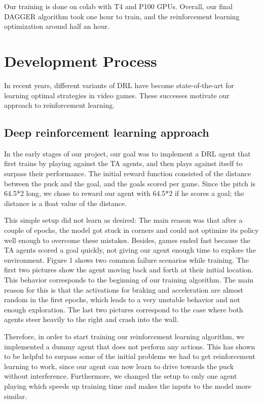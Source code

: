 \documentclass[10pt,twocolumn,letterpaper]{article}
\begin{document}
Our training is done on colab with T4 and P100 GPUs. Overall, our final DAGGER algorithm took one hour to train, and the reinforcement learning optimization around half an hour.



\section{Development Process}

In recent years, different variants of DRL have become state-of-the-art for learning optimal strategies in video games. These successes motivate our approach to reinforcement learning. 

\subsection{Deep reinforcement learning approach}
In the early stages of our project, our goal was to implement a DRL agent that first trains by playing against the TA agents, and then plays against itself to surpass their performance. The initial reward function consisted of the distance between the puck and the goal, and the goals scored per game. Since the pitch is 64.5*2 long, we chose to reward our agent with 64.5*2 if he scores a goal; the distance is a float value of the distance. 

This simple setup did not learn as desired: The main reason was that after a couple of epochs, the model got stuck in corners and could not optimize its policy well enough to overcome these mistakes. Besides, games ended fast because the TA agents scored a goal quickly, not giving our agent enough time to explore the environment. Figure 1 shows two common failure scenarios while training. The first two pictures show the agent moving back and forth at their initial location. This behavior corresponds to the beginning of our training algorithm. The main reason for this is that the activations for braking and acceleration are almost random in the first epochs, which leads to a very unstable behavior and not enough exploration. The last two pictures correspond to the case where both agents steer heavily to the right and crash into the wall.

Therefore, in order to start training our reinforcement learning algorithm, we implemented a dummy agent that does not perform any actions. This has shown to be helpful to surpass some of the initial problems we had to get reinforcement learning to work, since our agent can now learn to drive towards the puck without interference. Furthermore, we changed the setup to only one agent playing which speeds up training time and makes the inputs to the model more similar.
\end{document}
